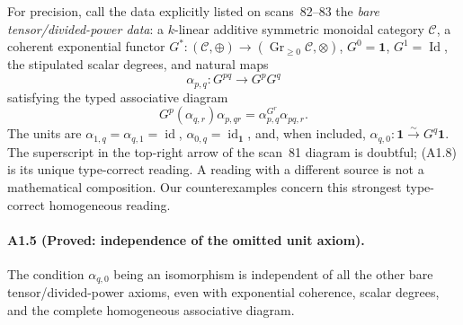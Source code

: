 For precision, call the data explicitly listed on scans~82--83 the
\emph{bare tensor/divided-power data}: a $k$-linear additive symmetric
monoidal category $\mathcal C$, a coherent exponential functor
$G^*:(\mathcal C,\oplus)\to(\operatorname{Gr}_{\geq0}\mathcal C,\otimes)$,
$G^0=\mathbf1$, $G^1=\operatorname{Id}$, the stipulated scalar degrees,
and natural maps
\[
 \alpha_{p,q}:G^{pq}\longrightarrow G^pG^q
\]
satisfying the typed associative diagram
\[
 G^p(\alpha_{q,r})\alpha_{p,qr}
       =\alpha_{p,q}^{G^r}\alpha_{pq,r}.
 \tag{A1.8}
\]
The units are $\alpha_{1,q}=\alpha_{q,1}=\operatorname{id}$,
$\alpha_{0,q}=\operatorname{id}_{\mathbf1}$, and, when included,
$\alpha_{q,0}:\mathbf1\overset\sim\longrightarrow G^q\mathbf1$.
The superscript in the top-right arrow of the scan~81 diagram is doubtful;
(A1.8) is its unique type-correct reading. A reading with a different
source is not a mathematical composition. Our counterexamples concern
this strongest type-correct homogeneous reading.

\paragraph{A1.5 (Proved: independence of the omitted unit axiom).}
The condition $\alpha_{q,0}$ being an isomorphism is independent of all
the other bare tensor/divided-power axioms, even with exponential
coherence, scalar degrees, and the complete homogeneous associative
diagram.

